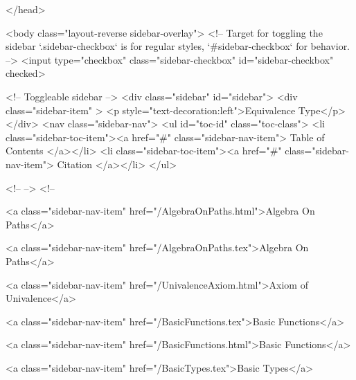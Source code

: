   
</head>




  <body class="layout-reverse sidebar-overlay">
    <!-- Target for toggling the sidebar `.sidebar-checkbox` is for regular
     styles, `#sidebar-checkbox` for behavior. -->
<input type="checkbox" class="sidebar-checkbox" id="sidebar-checkbox" checked>

<!-- Toggleable sidebar -->
<div class="sidebar" id="sidebar">
  <div class="sidebar-item" >
    <p style="text-decoration:left">Equivalence Type</p>
  </div>
  <nav class="sidebar-nav">
    <ul id="toc-id" class="toc-class">
  <li class="sidebar-toc-item"><a href="#" class="sidebar-nav-item"> Table of Contents </a></li>
  <li class="sidebar-toc-item"><a href="#" class="sidebar-nav-item"> Citation </a></li>
</ul>


    <!--  -->
    <!-- 
      
    
      
    
      
    
      
        
      
    
      
        
          <a class="sidebar-nav-item" href="/AlgebraOnPaths.html">Algebra On Paths</a>
        
      
    
      
        
          <a class="sidebar-nav-item" href="/AlgebraOnPaths.tex">Algebra On Paths</a>
        
      
    
      
        
          <a class="sidebar-nav-item" href="/UnivalenceAxiom.html">Axiom of Univalence</a>
        
      
    
      
        
          <a class="sidebar-nav-item" href="/BasicFunctions.tex">Basic Functions</a>
        
      
    
      
        
          <a class="sidebar-nav-item" href="/BasicFunctions.html">Basic Functions</a>
        
      
    
      
        
          <a class="sidebar-nav-item" href="/BasicTypes.tex">Basic Types</a>
        
      
    
      
        
